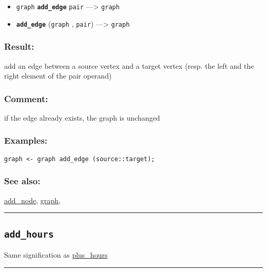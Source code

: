 \documentclass[]{book}
\providecommand{\tightlist}{%
  \setlength{\itemsep}{0pt}\setlength{\parskip}{0pt}}
\theoremstyle{definition}
\theoremstyle{definition}
\theoremstyle{definition}
\theoremstyle{remark}
\begin{document}
\begin{itemize}
\tightlist
\item
  \texttt{graph} \textbf{\texttt{add\_edge}} \texttt{pair}
  ---\textgreater{} \texttt{graph}
\item
  \textbf{\texttt{add\_edge}} (\texttt{graph} , \texttt{pair})
  ---\textgreater{} \texttt{graph}
\end{itemize}

\subsubsection{Result:}\label{result-19}

add an edge between a source vertex and a target vertex (resp. the left
and the right element of the pair operand)

\subsubsection{Comment:}\label{comment-3}

if the edge already exists, the graph is unchanged

\subsubsection{Examples:}\label{examples-15}

\begin{verbatim}
graph <- graph add_edge (source::target); 
\end{verbatim}

\subsubsection{See also:}\label{see-also-16}

\href{operators-a-to-a.html\#add_node}{add\_node},
\href{operators-d-to-h.html\#graph}{graph},

\begin{center}\rule{0.5\linewidth}{\linethickness}\end{center}

\subsection{\texorpdfstring{\texttt{add\_hours}}{add\_hours}}\label{add_hours}

Same signification as
\href{operators-n-to-r.html\#plus_hours}{plus\_hours}

\begin{center}\rule{0.5\linewidth}{\linethickness}\end{center}
\end{document}
